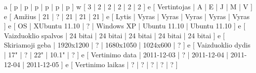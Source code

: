 \xtableu
{
  a [ p | p | p | p | p | p ]
  w [ 3 | 2 | 2 | 2 | 2 | 2 ]
  e [ Vertintojas         | A | E | J | M | V ]
  e [ Amžius              | 21 | ? | 21 | 21 | 21 ]
  e [ Lytis               | Vyras | Vyras | Vyras | Vyras | Vyras ]
  e [ OS                  | XUbuntu 11.10 | ? | Windows XP | Ubuntu 11.10 | Ubuntu 11.10 ]
  e [ Vaizduoklio spalvos | 24 bitai | 24 bitai | 24 bitai | 24 bitai | 24 bitai ]
  e [ Skiriamoji geba     | 1920x1200 | ? | 1680x1050 | 1024x600 | ? ]
  e [ Vaizduoklio dydis   | 17" | ? | 22" | 10.1" | ? ]
  e [ Vertinimo data      | 2011-12-03 | ? | 2011-12-04 | 2011-12-04  | 2011-12-05 ]
  e [ Vertinimo laikas    | ? | ? | ? | ? | ? ]
}
